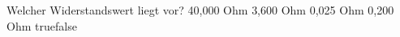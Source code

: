     {Welcher Widerstandswert liegt vor?}
    {40,000 Ohm}
    {3,600 Ohm}
    {0,025 Ohm}
    {0,200 Ohm}
    {true}{false}